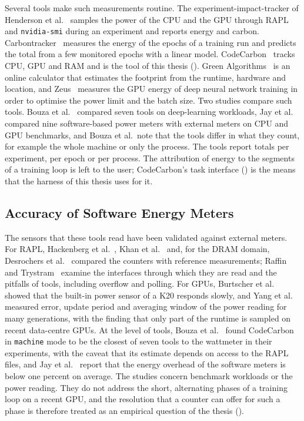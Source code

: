 Several tools make such measurements routine.
The experiment-impact-tracker of Henderson et al.~\cite{henderson2020systematic} samples the power of the CPU and the GPU through RAPL and \texttt{nvidia-smi} during an experiment and reports energy and carbon.
Carbontracker~\cite{anthony2020carbontracker} measures the energy of the epochs of a training run and predicts the total from a few monitored epochs with a linear model.
CodeCarbon~\cite{codecarbon} tracks CPU, GPU and RAM and is the tool of this thesis ().
Green Algorithms~\cite{lannelongue2021green} is an online calculator that estimates the footprint from the runtime, hardware and location, and Zeus~\cite{you2023zeus} measures the GPU energy of deep neural network training in order to optimise the power limit and the batch size.
Two studies compare such tools.
Bouza et al.~\cite{bouza2023carbon} compared seven tools on deep-learning workloads, Jay et al.~\cite{jay2023softwaremeters} compared nine software-based power meters with external meters on CPU and GPU benchmarks, and Bouza et al.\ note that the tools differ in what they count, for example the whole machine or only the process.
The tools report totals per experiment, per epoch or per process.
The attribution of energy to the segments of a training loop is left to the user; CodeCarbon's task interface () is the means that the harness of this thesis uses for it.

\subsection{Accuracy of Software Energy Meters}\label{sec:related-meter-accuracy}

The sensors that these tools read have been validated against external meters.
For RAPL, Hackenberg et al.~\cite{hackenberg2013power}, Khan et al.~\cite{khan2018rapl} and, for the DRAM domain, Desrochers et al.~\cite{desrochers2016dram} compared the counters with reference measurements; Raffin and Trystram~\cite{raffin2024dissecting} examine the interfaces through which they are read and the pitfalls of tools, including overflow and polling.
For GPUs, Burtscher et al.~\cite{burtscher2014k20} showed that the built-in power sensor of a K20 responds slowly, and Yang et al.~\cite{yang2023parttime} measured error, update period and averaging window of the power reading for many generations, with the finding that only part of the runtime is sampled on recent data-centre GPUs.
At the level of tools, Bouza et al.~\cite{bouza2023carbon} found CodeCarbon in \texttt{machine} mode to be the closest of seven tools to the wattmeter in their experiments, with the caveat that its estimate depends on access to the RAPL files, and Jay et al.~\cite{jay2023softwaremeters} report that the energy overhead of the software meters is below one percent on average.
The studies concern benchmark workloads or the power reading.
They do not address the short, alternating phases of a training loop on a recent GPU, and the resolution that a counter can offer for such a phase is therefore treated as an empirical question of the thesis ().


